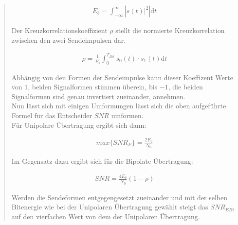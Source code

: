 \begin{quote}
    \begin{equation*}
    	\begin{split}
    		E_b = \int_{-\infty}^{\infty} \left | s(t)|^2 \right | \mathrm dt
    	\end{split}
        
    \end{equation*}
    
    
    Der Kreuzkorrelationskoeffizient $\rho$ stellt die normierte Kreuzkorrelation zwischen den zwei Sendeimpulsen dar.\cite{kreuz}
    
    \begin{equation*}
    	\begin{split}
    		\rho = \frac{1}{E_b} \int_{0}^{T_{Bit}} s_0(t) \cdot s_1(t) \mathrm dt
    	\end{split}
    \end{equation*}
    
    Abhängig von den Formen der Sendeimpulse kann dieser Koeffizent Werte von $1$, beiden Signalformen stimmen überein,
    bis $-1$, die beiden Signalformen sind genau invertiert zueinander, annehmen.\\
        
    Nun lässt sich mit einigen Umformungen lässt sich die oben aufgeführte Formel für das Entscheider $SNR$ umformen.\\
    Für Unipolare Übertragung ergibt sich dann:
    
    \begin{equation*}
    	\begin{split}
    		max\{SNR_E\} = \frac{2 E_b}{N_0}
    	\end{split}
    \end{equation*}
    
    Im Gegensatz dazu ergibt sich für die Bipolate Übertragung:
    
    \begin{equation*}
    	\begin{split}
    		SNR = \frac{4 E_b}{N_0} (1-\rho)
    	\end{split}
    \end{equation*}
    
    Werden die Sendeformen entgegengesetzt zueinander und mit der selben Bitenergie wie bei der Unipolaren
    Übertragung gewählt steigt das $SNR_{E Bi}$ auf den vierfachen Wert von dem der Unipolaren Übertragung.\\
    
    
    
    
	
\end{quote}%

